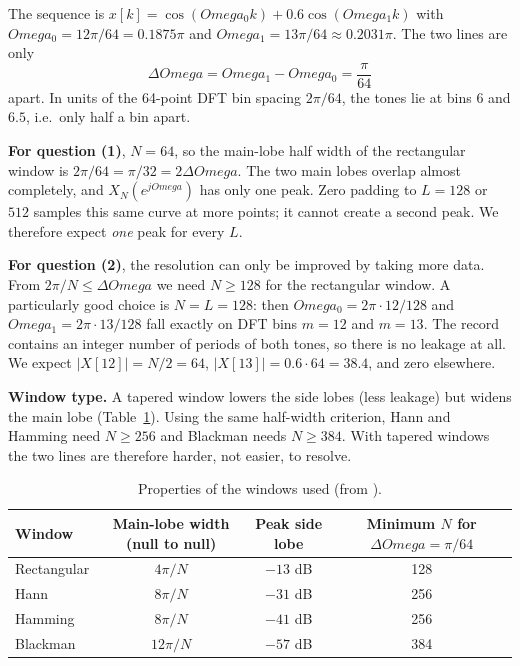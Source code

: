 \documentclass[12pt, a4paper]{article}
\def\Omega{Omega}%
\begin{document}
The sequence is $x[k]=\cos(\Omega_0k)+0.6\cos(\Omega_1k)$ with $\Omega_0=12\pi/64=0.1875\pi$ and $\Omega_1=13\pi/64\approx0.2031\pi$. The two lines are only
\begin{equation}
    \Delta\Omega=\Omega_1-\Omega_0=\frac{\pi}{64}
\end{equation}
apart. In units of the 64-point DFT bin spacing $2\pi/64$, the tones lie at bins $6$ and $6.5$, i.e.\ only half a bin apart.

\textbf{For question (1)}, $N=64$, so the main-lobe half width of the rectangular window is $2\pi/64=\pi/32=2\Delta\Omega$. The two main lobes overlap almost completely, and $X_N(e^{j\Omega})$ has only one peak. Zero padding to $L=128$ or $512$ samples this same curve at more points; it cannot create a second peak. We therefore expect \emph{one} peak for every $L$.

\textbf{For question (2)}, the resolution can only be improved by taking more data. From $2\pi/N\le\Delta\Omega$ we need $N\ge128$ for the rectangular window. A particularly good choice is $N=L=128$: then $\Omega_0=2\pi\cdot12/128$ and $\Omega_1=2\pi\cdot13/128$ fall exactly on DFT bins $m=12$ and $m=13$. The record contains an integer number of periods of both tones, so there is no leakage at all. We expect $|X[12]|=N/2=64$, $|X[13]|=0.6\cdot64=38.4$, and zero elsewhere.

\textbf{Window type.} A tapered window lowers the side lobes (less leakage) but widens the main lobe (Table~\ref{tab:windows}). Using the same half-width criterion, Hann and Hamming need $N\ge256$ and Blackman needs $N\ge384$. With tapered windows the two lines are therefore harder, not easier, to resolve.

\begin{table}[!htbp]
\centering
\caption{Properties of the windows used (from \cite{harris}).}
\label{tab:windows}
\small
\begin{tabular}{lccc}
\toprule
Window & Main-lobe width (null to null) & Peak side lobe & Minimum $N$ for $\Delta\Omega=\pi/64$\\
\midrule
Rectangular & $4\pi/N$  & $-13$ dB & 128 \\
Hann        & $8\pi/N$  & $-31$ dB & 256 \\
Hamming     & $8\pi/N$  & $-41$ dB & 256 \\
Blackman    & $12\pi/N$ & $-57$ dB & 384 \\
\bottomrule
\end{tabular}
\end{table}
\end{document}
